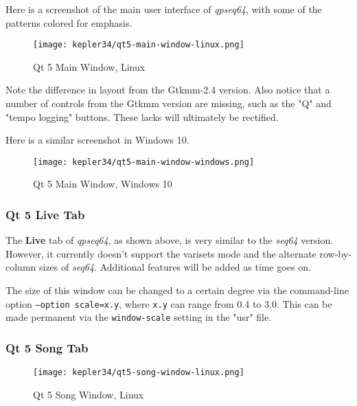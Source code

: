    Here is a screenshot of the main user interface of \textsl{qpseq64}, with
   some of the patterns colored for emphasis.

\begin{figure}[H]
   \centering 
   \texttt{[image: kepler34/qt5-main-window-linux.png]}
   \caption{Qt 5 Main Window, Linux}
   \label{fig:qt5_main_window_linux}
\end{figure}

   Note the difference in layout from the Gtkmm-2.4 version.  Also notice that
   a number of controls from the Gtkmm version are missing, such as the "Q" and
   "tempo logging" buttons.  These lacks will ultimately be rectified.

   Here is a similar screenshot in Windows 10.

\begin{figure}[H]
   \centering 
   \texttt{[image: kepler34/qt5-main-window-windows.png]}
   \caption{Qt 5 Main Window, Windows 10}
   \label{fig:qt5_main_window_windows}
\end{figure}

\subsubsection{Qt 5 Live Tab}
\label{subsubsec:qt_portmidi_qt5_live_tab}

   The \textbf{Live} tab of \textsl{qpseq64}, as shown above, is very similar
   to the \textsl{seq64} version.  However, it currently doesn't support the
   varisets mode and the alternate row-by-column sizes of \textsl{seq64}.
   Additional features will be added as time goes on.

   The size of this window can be changed to a certain degree via
   the command-line option \texttt{--option scale=x.y}, where \texttt{x.y} can
   range from 0.4 to 3.0.  This can be made permanent via the
   \texttt{window-scale} setting in the "usr" file.

\subsubsection{Qt 5 Song Tab}
\label{subsubsec:qt_portmidi_qt5_song_tab}

\begin{figure}[H]
   \centering 
   \texttt{[image: kepler34/qt5-song-window-linux.png]}
   \caption{Qt 5 Song Window, Linux}
   \label{fig:qt5_song_window_linux}
\end{figure}

